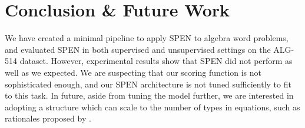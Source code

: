 \documentclass[11pt,letterpaper]{article}
\begin{document}
\section{Conclusion \& Future Work}
We have created a minimal pipeline to apply SPEN to algebra word problems, and evaluated SPEN in both supervised and unsupervised settings on the ALG-514 dataset. However, experimental results show that SPEN did not perform as well as we expected. We are suspecting that our scoring function is not sophisticated enough, and our SPEN architecture is not tuned sufficiently to fit to this task. In future, aside from tuning the model further, we are interested in adopting a structure which can scale to the number of types in equations, such as rationales proposed by \cite{DBLP:journals/corr/LingYDB17}.
\nocite{*}


\end{document}
